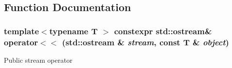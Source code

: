 \subsection{Function Documentation}
\hypertarget{group__reflection_gbd3ce49df2aedd37c653a40d28c15b2f}{
\subsubsection[{operator$<$$<$}]{\setlength{\rightskip}{0pt plus 5cm}template$<$typename T $>$ constexpr std::ostream\& operator$<$$<$ (std::ostream \& {\em stream}, \/  const T \& {\em object})}}
\label{group__reflection_gbd3ce49df2aedd37c653a40d28c15b2f}


Public stream operator 